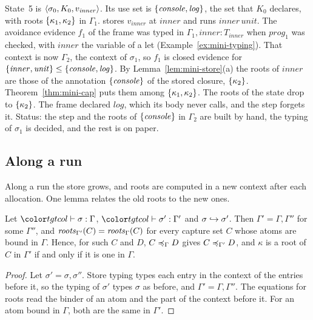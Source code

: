 \begin{example}\label{ex:mini-alloc}
State~5 is $\mst{\sigma_0}{K_0}{v_{\mathit{inner}}}$. Its use set is $\cset{\mathit{console}, \mathit{log}}$, the set that $K_0$ declares, with roots $\cset{\kappa_1, \kappa_2}$ in $\Gamma_1$.  stores $v_{\mathit{inner}}$ at $\mathit{inner}$ and runs $\mathit{inner}\,\mathit{unit}$. The avoidance evidence $f_1$ of the frame was typed in $\Gamma_1, \mathit{inner} : T_{\mathit{inner}}$ when $\mathit{prog}_1$ was checked, with $\mathit{inner}$ the variable of a let (Example~\ref{ex:mini-typing}). That context is now $\Gamma_2$, the context of $\sigma_1$, so $f_1$ is closed evidence for $\cset{\mathit{inner}, \mathit{unit}} \le \cset{\mathit{console}, \mathit{log}}$. By Lemma~\ref{lem:mini-store}(a) the roots of $\mathit{inner}$ are those of the annotation $\cset{\mathit{console}}$ of the stored closure, $\cset{\kappa_2}$. Theorem~\ref{thm:mini-cap} puts them among $\cset{\kappa_1, \kappa_2}$. The roots of the state drop to $\cset{\kappa_2}$. The frame declared $\mathit{log}$, which its body never calls, and the step forgets it. Status: the step and the roots of $\cset{\mathit{console}}$ in $\Gamma_2$ are built by hand, the typing of $\sigma_1$ is decided, and the rest is on paper.
\end{example}

\FloatBarrier
\subsection{Along a run}\label{sec:mini-run}

Along a run the store grows, and roots are computed in a new context after each allocation. One lemma relates the old roots to the new ones.

\begin{lemma}\label{lem:mini-ext}
Let $\storej{\sigma}{\Gamma}$, $\storej{\sigma'}{\Gamma'}$ and $\sext{\sigma}{\sigma'}$. Then $\Gamma' = \Gamma, \Gamma''$ for some $\Gamma''$, and $\roots{\Gamma'}{C} = \roots{\Gamma}{C}$ for every capture set $C$ whose atoms are bound in $\Gamma$. Hence, for such $C$ and $D$, $\caple{\Gamma}{C}{D}$ gives $\caple{\Gamma'}{C}{D}$, and $\kappa$ is a root of $C$ in $\Gamma'$ if and only if it is one in $\Gamma$.
\end{lemma}

\begin{proof}
Let $\sigma' = \sigma, \sigma''$. Store typing types each entry in the context of the entries before it, so the typing of $\sigma'$ types $\sigma$ as before, and $\Gamma' = \Gamma, \Gamma''$. The equations for roots read the binder of an atom and the part of the context before it. For an atom bound in $\Gamma$, both are the same in $\Gamma'$.
\end{proof}

